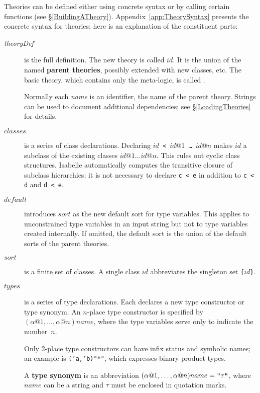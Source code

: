 Theories can be defined either using concrete syntax or by calling certain
\ML{} functions (see \S\ref{BuildingATheory}).  Appendix~\ref{app:TheorySyntax}
presents the concrete syntax for theories; here is an explanation of the
constituent parts: 
\begin{description} 
\item[{\it theoryDef}] 
  is the full definition.  The new theory is called $id$.  It is the union
  of the named {\bf parent theories}, possibly
  extended with new classes, etc.  The basic theory, which contains only
  the meta-logic, is called .

  Normally each {\it name\/} is an identifier, the name of the parent
  theory.  Strings can be used to document additional dependencies; see
  \S\ref{LoadingTheories} for details.

\item[$classes$] 
  is a series of class declarations.  Declaring {\tt$id$ < $id@1$ \dots\ 
    $id@n$} makes $id$ a subclass of the existing classes $id@1\dots
  id@n$.  This rules out cyclic class structures.  Isabelle automatically
  computes the transitive closure of subclass hierarchies; it is not
  necessary to declare {\tt c < e} in addition to {\tt c < d} and {\tt d <
    e}.

\item[$default$] 
  introduces $sort$ as the new default sort for type variables.  This
  applies to unconstrained type variables in an input string but not to
  type variables created internally.  If omitted, the default sort is the
  union of the default sorts of the parent theories.

\item[$sort$] 
  is a finite set of classes.  A single class $id$ abbreviates the singleton
  set {\tt\{}$id${\tt\}}.

\item[$types$] 
  is a series of type declarations.  Each declares a new type constructor
  or type synonym.  An $n$-place type constructor is specified by
  $(\alpha@1,\dots,\alpha@n)name$, where the type variables serve only to
  indicate the number~$n$.

  Only 2-place type constructors can have infix status and symbolic names;
  an example is {\tt ('a,'b)"*"}, which expresses binary product types.

  A {\bf type synonym} is an abbreviation
  $(\alpha@1,\dots,\alpha@n)name = \mbox{\tt"}\tau\mbox{\tt"}$, where
  $name$ can be a string and $\tau$ must be enclosed in quotation marks.
  

\end{description}
